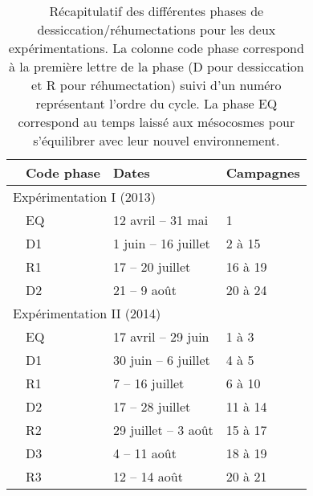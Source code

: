 

\begin{table}
\centering
\caption{Récapitulatif des différentes phases de dessiccation/réhumectations pour les deux expérimentations. La colonne code phase correspond à la première lettre de la phase (D pour dessiccation et R pour réhumectation) suivi d'un numéro représentant l'ordre du cycle. La phase EQ correspond au temps laissé aux mésocosmes pour s'équilibrer avec leur nouvel environnement.}
\label{table:recap_DR}
\begin{tabular}{llll}\toprule
 & Code phase & Dates & Campagnes \\ \midrule
\multicolumn{4}{l}{Expérimentation I (2013)} \\
 & EQ & 12 avril -- 31 mai & 1 \\ [+.5ex]
 & D1 & 1 juin -- 16 juillet & 2 à 15 \\
 & R1 & 17 -- 20 juillet & 16 à 19 \\
 & D2 & 21 -- 9 août & 20 à 24 \\ [+1ex]
\multicolumn{4}{l}{Expérimentation II (2014)} \\
 & EQ & 17 avril -- 29 juin & 1 à 3 \\ [+.5ex]
 & D1 & 30 juin -- 6 juillet & 4 à 5 \\
 & R1 & 7 -- 16 juillet & 6 à 10 \\ [+.5ex]
 & D2 & 17 -- 28 juillet & 11 à 14\\
 & R2 & 29 juillet -- 3 août & 15 à 17\\[+.5ex]
 & D3 & 4 -- 11 août & 18 à 19\\
 & R3 & 12 -- 14 août & 20 à 21\\
\bottomrule
\end{tabular}
\end{table}


